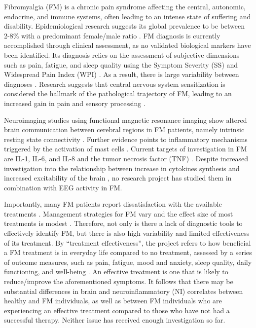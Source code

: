 \documentclass[twocolumn,  rga,issue, numeric]{jote-new-article}
\begin{document}
Fibromyalgia (FM) is a chronic pain syndrome affecting the central,
autonomic, endocrine, and immune systems, often leading to an intense
state of suffering and disability. Epidemiological research suggests its
global prevalence to be between 2-8\% with a predominant female/male
ratio \cite{Clauw2014}. FM diagnosis is currently accomplished through
clinical assessment, as no validated biological markers have been
identified. Its diagnosis relies on the assessment of subjective
dimensions such as pain, fatigue, and sleep quality using the Symptom
Severity (SS) and Widespread Pain Index (WPI) \cite{Wolfe2010}. As a
result, there is large variability between diagnoses \cite{Walitt2016}.
Research suggests that central nervous system sensitization is
considered the hallmark of the pathological trajectory of FM, leading to
an increased gain in pain and sensory processing \cite{Sluka2016}.

Neuroimaging studies using functional magnetic resonance imaging show
altered brain communication between cerebral regions in FM patients,
namely intrinsic resting state connectivity \cite{Napadow2012,Napadow2010}.
Further evidence points to inflammatory mechanisms triggered by the
activation of mast cells \cite{Chatterjea2015}. Current targets of
investigation in FM are IL-1, IL-6, and IL-8 and the tumor necrosis
factor (TNF) \cite{Theoharides2015}. Despite increased investigation into
the relationship between increase in cytokines synthesis and increased
excitability of the brain \cite{Galic2012}, no research project has
studied them in combination with EEG activity in FM.

Importantly, many FM patients report dissatisfaction with the available
treatments \cite{Lauche2013}. Management strategies for FM vary and
the effect size of most treatments is modest \cite{Macfarlane2016}.
Therefore, not only is there a lack of diagnostic tools to effectively
identify FM, but there is also high variability and limited
effectiveness of its treatment. By ``treatment effectiveness'', the
project refers to how beneficial a FM treatment is in everyday life
compared to no treatment, assessed by a series of outcome measures, such
as pain, fatigue, mood and anxiety, sleep quality, daily functioning,
and well-being \cite{Carville2008}. An effective treatment is one that
is likely to reduce/improve the aforementioned symptoms. It follows that
there may be substantial differences in brain and neuroinflammatory (NI)
correlates between healthy and FM individuals, as well as between FM
individuals who are experiencing an effective treatment compared to
those who have not had a successful therapy. Neither issue has received
enough investigation so far.
\end{document}
